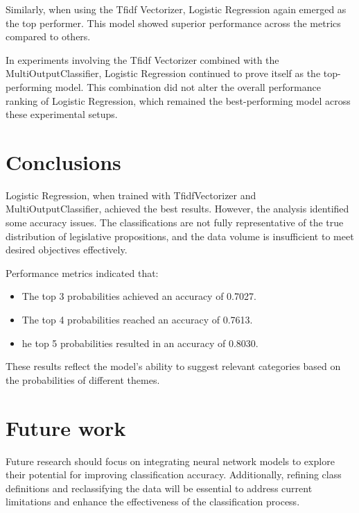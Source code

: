 \documentclass[12pt]{article}
\begin{document}
Similarly, when using the Tfidf Vectorizer, Logistic Regression again emerged as the top performer. This model showed superior performance across the metrics compared to others.

In experiments involving the Tfidf Vectorizer combined with the MultiOutputClassifier, Logistic Regression continued to prove itself as the top-performing model. This combination did not alter the overall performance ranking of Logistic Regression, which remained the best-performing model across these experimental setups.

\section{Conclusions}

Logistic Regression, when trained with TfidfVectorizer and MultiOutputClassifier, achieved the best results. However, the analysis identified some accuracy issues. The classifications are not fully representative of the true distribution of legislative propositions, and the data volume is insufficient to meet desired objectives effectively.

Performance metrics indicated that:

\begin{itemize}
	\item The top 3 probabilities achieved an accuracy of 0.7027.
	\item The top 4 probabilities reached an accuracy of 0.7613.
	\item he top 5 probabilities resulted in an accuracy of 0.8030.
\end{itemize}

These results reflect the model's ability to suggest relevant categories based on the probabilities of different themes.

\section{Future work}


Future research should focus on integrating neural network models to explore their potential for improving classification accuracy. Additionally, refining class definitions and reclassifying the data will be essential to address current limitations and enhance the effectiveness of the classification process.

	


	
\end{document}
